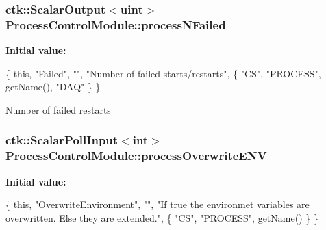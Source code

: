\subsubsection[{\texorpdfstring{process\+N\+Failed}{processNFailed}}]{\setlength{\rightskip}{0pt plus 5cm}ctk\+::\+Scalar\+Output$<$uint$>$ Process\+Control\+Module\+::process\+N\+Failed}\hypertarget{structProcessControlModule_a14a9aee3312baf85c8999c778b169039}{}\label{structProcessControlModule_a14a9aee3312baf85c8999c778b169039}
{\bfseries Initial value\+:}
\begin{DoxyCode}
\{ \textcolor{keyword}{this}, \textcolor{stringliteral}{"Failed"}, \textcolor{stringliteral}{""}, \textcolor{stringliteral}{"Number of failed starts/restarts"},
    \{ \textcolor{stringliteral}{"CS"}, \textcolor{stringliteral}{"PROCESS"}, getName(), \textcolor{stringliteral}{"DAQ"} \} \}
\end{DoxyCode}
Number of failed restarts 
\subsubsection[{\texorpdfstring{process\+Overwrite\+E\+NV}{processOverwriteENV}}]{\setlength{\rightskip}{0pt plus 5cm}ctk\+::\+Scalar\+Poll\+Input$<$int$>$ Process\+Control\+Module\+::process\+Overwrite\+E\+NV}\hypertarget{structProcessControlModule_ac858a14ada8c35c55e01258122eb20b8}{}\label{structProcessControlModule_ac858a14ada8c35c55e01258122eb20b8}
{\bfseries Initial value\+:}
\begin{DoxyCode}
\{ \textcolor{keyword}{this}, \textcolor{stringliteral}{"OverwriteEnvironment"}, \textcolor{stringliteral}{""},
    \textcolor{stringliteral}{"If true the environmet variables are overwritten. Else they are extended."},
    \{ \textcolor{stringliteral}{"CS"}, \textcolor{stringliteral}{"PROCESS"}, getName() \} \}
\end{DoxyCode}
